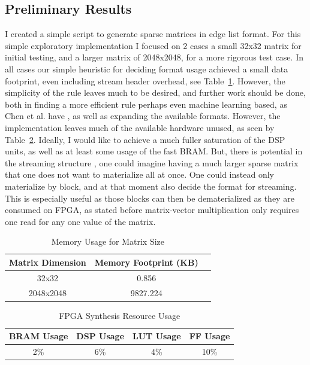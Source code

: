 \subsection{Preliminary Results}
I created a simple script to generate sparse matrices in edge list format. For this simple exploratory implementation I focused on 2 cases a small 32x32 matrix for initial testing, and a larger matrix of 2048x2048, for a more rigorous test case. In all cases our simple heuristic for deciding format usage achieved a small data footprint, even including stream header overhead, see Table~\ref{tab:memory-usage}. However, the simplicity of the rule leaves much to be desired, and further work should be done, both in finding a more efficient rule perhaps even machine learning based, as Chen et al. have \cite{hybrid_format}, as well as expanding the available formats. However, the implementation leaves much of the available hardware unused, as seen by Table~\ref{tab:fpga-usage}. Ideally, I would like to achieve a much fuller saturation of the DSP units, as well as at least some usage of the fast BRAM. But, there is potential in the streaming structure \cite{fpga-stream}, one could imagine having a much larger sparse matrix that one does not want to materialize all at once. One could instead only materialize by block, and at that moment also decide the format for streaming. This is especially useful as those blocks can then be dematerialized as they are consumed on FPGA, as stated before matrix-vector multiplication only requires one read for any one value of the matrix.
\begin{table}[htbp]
\centering
\caption{Memory Usage for Matrix Size}
\label{tab:memory-usage}
\begin{tabular}{|c|c|c|}
\hline
\textbf{Matrix Dimension} & \textbf{Memory Footprint (KB)} \\
\hline
32x32     & 0.856 \\
2048x2048     & 9827.224   \\
\hline
\end{tabular}
\end{table}

\begin{table}[htbp]
\centering
\caption{FPGA Synthesis Resource Usage}
\label{tab:fpga-usage}
\begin{tabular}{|c|c|c|c|}
\hline
\textbf{BRAM Usage} & \textbf{DSP Usage} & \textbf{LUT Usage} & \textbf{FF Usage}  \\
\hline
2\% & 6\% & 4\% & 10\%        \\
\hline
\end{tabular}
\end{table}



